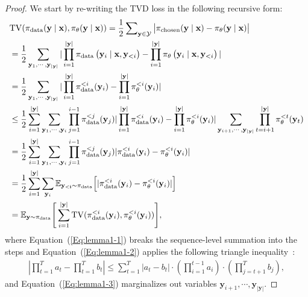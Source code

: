 \begin{proof}
We  start by re-writing the TVD loss in the following recursive form:
\begin{align}
    & {\mathrm{TV}}(\pi_{\rm{data}}(\mathbf{y} \mid \mathbf{x}), \pi_{\theta}(\mathbf{y} \mid \mathbf{x}))=\frac{1}{2}\sum  \nolimits_{\mathbf{y}\in \mathcal{Y}} \left| \pi_{\rm{chosen}}(\mathbf{y}\mid\mathbf{x}) -  \pi_\mathbf{\theta}(\mathbf{y} \mid \mathbf{x})  \right|\\
     &=\frac{1}{2} \sum_{\mathbf{y}_1,\cdots,\mathbf{y}_{|\mathbf{y}|}}|\prod_{i=1}^{|\mathbf{y}|} \pi_{\rm{data}}\left(\mathbf{y}_i \mid \mathbf{x}, \mathbf{y}_{<i}\right)-\prod_{i=1}^{|\mathbf{y}|} \pi_\theta\left(\mathbf{y}_i \mid \mathbf{x}, \mathbf{y}_{<i}\right)| \label{Eq:lemma1-1}\\
     &=\frac{1}{2} \sum_{\mathbf{y}_1,\cdots,\mathbf{y}_{|\mathbf{y}|}}|\prod_{i=1}^{|\mathbf{y}|} \pi_{\rm{data}}^{<i}(\mathbf{y}_{i})-\prod_{i=1}^{|\mathbf{y}|} \pi_{\theta}^{<i}(\mathbf{y}_{i})|\\
     &\leq \frac{1}{2}\sum_{i=1}^{|\mathbf{y}|}\sum_{\mathbf{y}_1,\cdots,\mathbf{y}_{i}}\prod _{j=1}^{i-1} \pi_{\rm{data}}^{<j}(\mathbf{y}_{j})|\prod_{i=1}^{|\mathbf{y}|} \pi_{\rm{data}}^{<i}(\mathbf{y}_{i})-\prod_{i=1}^{|\mathbf{y}|} \pi_{\theta}^{<i}(\mathbf{y}_{i})| \sum_{\mathbf{y}_{i+1},\cdots,\mathbf{y}_{|\mathbf{y}|}}\prod_{t=i+1}^{|\mathbf{y}|} \pi_{\theta}^{<t}(\mathbf{y}_{t}) \label{Eq:lemma1-2}\\
     &= \frac{1}{2}\sum_{i=1}^{|\mathbf{y}|}\sum_{\mathbf{y}_1,\cdots,\mathbf{y}_{i}}\prod _{j=1}^{i-1} \pi_{\rm{data}}^{<j}(\mathbf{y}_{j})|\pi_{\rm{data}}^{<i}(\mathbf{y}_{i})- \pi_{\theta}^{<i}(\mathbf{y}_{i})| \label{Eq:lemma1-3} \\
       &= \frac{1}{2}\sum_{i=1}^{|\mathbf{y}|}\sum_{\mathbf{y}_{i}} \mathbb{E}_{ \mathbf{y_{<i}}\sim \pi_{\rm{data}}}\Big[|\pi_{\rm{data}}^{<i}(\mathbf{y}_{i})- \pi_{\theta}^{<i}(\mathbf{y}_{i})|\Big]\\
       &=\mathbb{E}_{\mathbf{y}\sim \pi_{\rm{data}}}\Bigg[ \sum_{i=1}^{|\mathbf{y}|} \mathrm{TV}(\pi_{\rm{data}}^{<i}(\mathbf{y}_{i}),\pi_{\theta}^{<i}(\mathbf{y}_{i})) \Bigg],
\end{align}
where Equation~(\ref{Eq:lemma1-1}) breaks the sequence-level summation into the steps and Equation~(\ref{Eq:lemma1-2}) applies the following triangle inequality~\citep{wen2023f,jitailoring}:
\begin{align}
\left| \prod_{t=1}^{T} a_t - \prod_{t=1}^{T} b_t \right|
\leq \sum_{t=1}^{T} \left| a_t - b_t \right| \cdot
\left( \prod_{i=1}^{t-1} a_i \right) \cdot
\left( \prod_{j=t+1}^{T} b_j \right),
\end{align}
and Equation~(\ref{Eq:lemma1-3}) marginalizes out variables $\mathbf{y}_{i+1},\cdots,\mathbf{y}_{|\mathbf{y}|}$. 
\end{proof}


